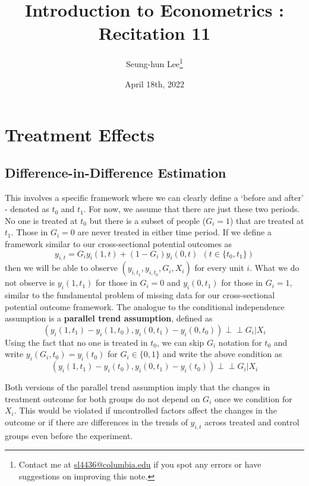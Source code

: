 \documentclass[12pt]{article}
\title{Introduction to Econometrics \ROM{2}: Recitation 11}
\theoremstyle{definition}
\theoremstyle{property}
\theoremstyle{assumption}
\theoremstyle{example}
\theoremstyle{comment}
\begin{document}
\linespread{1.25}
\onehalfspacing

\author{Seung-hun Lee\footnote{Contact me at \href{mailto:sl4436@columbia.edu}{sl4436@columbia.edu} if you spot any errors or have suggestions on improving this note.}}
\date{April 18th, 2022}
\maketitle
\thispagestyle{firstpage}


\section{Treatment Effects}


\subsection{Difference-in-Difference Estimation}
This involves a specific framework where we can clearly define a `before and after' - denoted as $t_0$ and $t_1$. For now, we assume that there are just these two periods. No one is treated at $t_0$ but there is a subset of people ($G_i=1$) that are treated at $t_1$. Those in $G_i=0$ are never treated in either time period. If we define a framework similar to our cross-sectional potential outcomes as
\[
y_{i,t}=G_iy_{i}(1,t)+(1-G_i)y_{i}(0,t) \ \ (t\in\{t_0, t_1\})
\]
then we will be able to observe $(y_{i,t_1}, y_{i,t_0},G_i, X_i)$ for every unit $i$. What we do not observe is $y_i(1,t_1)$ for those in $G_i=0$ and $y_i(0,t_1)$ for those in $G_i=1$, similar to the fundamental problem of missing data for our cross-sectional potential outcome framework. The analogue to the conditional independence assumption is a \textbf{parallel trend assumption}, defined as
\[
(y_i(1,t_1)-y_i(1,t_0), y_i(0,t_1)-y_i(0,t_0)) \perp\!\!\! \perp G_i|X_i
\]
Using the fact that no one is treated in $t_0$, we can skip $G_i$ notation for $t_0$ and write  $y_i(G_i,t_0)=y_i(t_0)$ for $G_i\in\{0,1\}$ and write the above condition as  
\[
(y_i(1,t_1)-y_i(t_0), y_i(0,t_1)-y_i(t_0)) \perp\!\!\! \perp G_i|X_i
\]\par
Both versions of the parallel trend assumption imply that the changes in treatment outcome for both groups do not depend on $G_i$ once we condition for $X_i$. This would be violated if uncontrolled factors affect the changes in the outcome or if there are differences in the trends of $y_{i,t}$ across treated and control groups even before the experiment. \par
\end{document}
